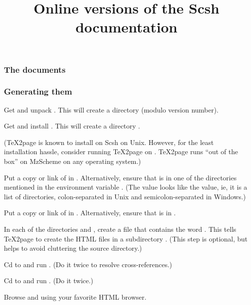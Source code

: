 \def\sv{0.6.2}


\title{Online versions of the Scsh documentation}

\subsubsection*{The documents}

\nocite{scsh-paper,scsh-man}




\subsubsection*{Generating them}

\enumerate
\item  Get and unpack 
.  
This will create a directory  
(modulo version number).  

\item  Get and install 
.  This will create a 
directory .   

(TeX2page is known to install on Scsh on Unix.  
However, for the least installation hassle,
consider
running TeX2page on
.
TeX2page runs ``out of the box'' on MzScheme on any
operating system.)

\item  Put a copy or link of
 in
.  Alternatively, ensure that 
 is in one of the directories
mentioned in the environment variable
.  (The  value looks like
the  value, ie, it is a list of directories,
colon-separated in Unix and semicolon-separated in
Windows.)

\item  Put a copy or link of  
in .  Alternatively,
ensure that  is in .

\item  In each of the directories 
and , create a file 
that contains the word .  This tells TeX2page to
create the HTML files in a subdirectory .  (This
step is optional, but helps to avoid cluttering
the source directory.)

\item  Cd to  and run .
(Do it twice to resolve cross-references.)

\item  Cd to  and run .
(Do it twice.)

\item  Browse  and 
 using your 
favorite HTML browser.  
\endenumerate

\bye
